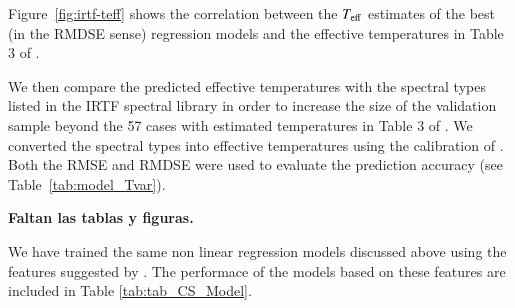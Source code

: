 Figure~\ref{fig:irtf-teff} shows the correlation between the $T_{\rm
eff}$ estimates of the best (in the RMDSE sense) regression models and
the effective temperatures in Table 3 of \cite{cesetti}. 

 

We then compare the predicted effective temperatures with the spectral
types listed in the IRTF spectral library in order to increase the
size of the validation sample beyond the 57 cases with estimated
temperatures in Table 3 of \cite{cesetti}. We converted the spectral
types into effective temperatures using the calibration of
\cite{2009ApJ...702..154S}. Both the RMSE and RMDSE were used to
evaluate the prediction accuracy (see Table~\ref{tab:model_Tvar}).

{\bf Faltan las tablas y figuras.}




We have trained the same non linear regression models discussed above
using the features suggested by \cite{cesetti}. The performace of the
models based on these features are included in Table
\ref{tab:tab_CS_Model}.

